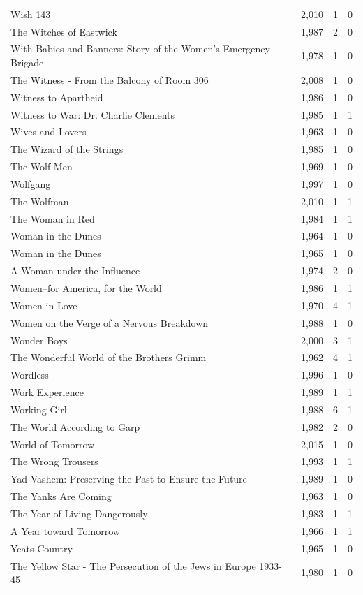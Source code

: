 \begin{tabular}{lrrr}
Wish 143 & 2,010 & 1 & 0 \\
The Witches of Eastwick & 1,987 & 2 & 0 \\
With Babies and Banners: Story of the Women's Emergency Brigade & 1,978 & 1 & 0 \\
The Witness - From the Balcony of Room 306 & 2,008 & 1 & 0 \\
Witness to Apartheid & 1,986 & 1 & 0 \\
Witness to War: Dr. Charlie Clements & 1,985 & 1 & 1 \\
Wives and Lovers & 1,963 & 1 & 0 \\
The Wizard of the Strings & 1,985 & 1 & 0 \\
The Wolf Men & 1,969 & 1 & 0 \\
Wolfgang & 1,997 & 1 & 0 \\
The Wolfman & 2,010 & 1 & 1 \\
The Woman in Red & 1,984 & 1 & 1 \\
Woman in the Dunes & 1,964 & 1 & 0 \\
Woman in the Dunes & 1,965 & 1 & 0 \\
A Woman under the Influence & 1,974 & 2 & 0 \\
Women--for America, for the World & 1,986 & 1 & 1 \\
Women in Love & 1,970 & 4 & 1 \\
Women on the Verge of a Nervous Breakdown & 1,988 & 1 & 0 \\
Wonder Boys & 2,000 & 3 & 1 \\
The Wonderful World of the Brothers Grimm & 1,962 & 4 & 1 \\
Wordless & 1,996 & 1 & 0 \\
Work Experience & 1,989 & 1 & 1 \\
Working Girl & 1,988 & 6 & 1 \\
The World According to Garp & 1,982 & 2 & 0 \\
World of Tomorrow & 2,015 & 1 & 0 \\
The Wrong Trousers & 1,993 & 1 & 1 \\
Yad Vashem: Preserving the Past to Ensure the Future & 1,989 & 1 & 0 \\
The Yanks Are Coming & 1,963 & 1 & 0 \\
The Year of Living Dangerously & 1,983 & 1 & 1 \\
A Year toward Tomorrow & 1,966 & 1 & 1 \\
Yeats Country & 1,965 & 1 & 0 \\
The Yellow Star - The Persecution of the Jews in Europe 1933-45 & 1,980 & 1 & 0 \\

\end{tabular}
